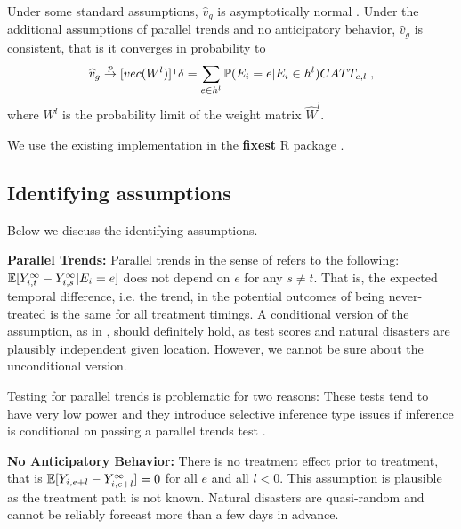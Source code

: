 Under some standard assumptions, $\widehat{v}_g$ is asymptotically normal \citep[for a proof and a detailed description of said assumptions see][Appendix C]{Sun_2021}. Under the additional assumptions of parallel trends and no anticipatory behavior, $\widehat{v}_g$ is consistent, that is it converges in probability to
\begin{align*}
	\widehat{v}_g \overset{p}{\to} [vec(W^{l})]^\intercal \delta = \sum_{e \in h^{l}} \mathbb{P}(E_i = e | E_i \in h^{l}) CATT_{e, l} \; ,
\end{align*}
where $W^{l}$ is the probability limit of the weight matrix $\widehat{W}^l$.


We use the existing implementation in the \textbf{fixest} R package \citep{Berge_2018}.

\subsection{Identifying assumptions}

Below we discuss the identifying assumptions.

\textbf{Parallel Trends:} Parallel trends in the sense of \cite{Sun_2021} refers to the following: $\mathbb{E}[Y_{i, t}^{\infty} - Y_{i, s}^{\infty} | E_i = e]$ does not depend on $e$ for any $s \neq t$. That is, the expected temporal difference, i.e. the trend, in the potential outcomes of being never-treated is the same for all treatment timings. A conditional version of the assumption, as in \cite{Callaway_2021}, should definitely hold, as test scores and natural disasters are plausibly independent given location. However, we cannot be sure about the unconditional version.

Testing for parallel trends is problematic for two reasons: These tests tend to have very low power and they introduce selective inference type issues if inference is conditional on passing a parallel trends test \citep{Rambachan_2019}.

\textbf{No Anticipatory Behavior:} There is no treatment effect prior to treatment, that is $\mathbb{E}[Y_{i, e+l} - Y_{i, e+l}^{\infty}] = 0$ for all $e$ and all $l < 0$. This assumption is plausible as the treatment path is not known. Natural disasters are quasi-random and cannot be reliably forecast more than a few days in advance.




